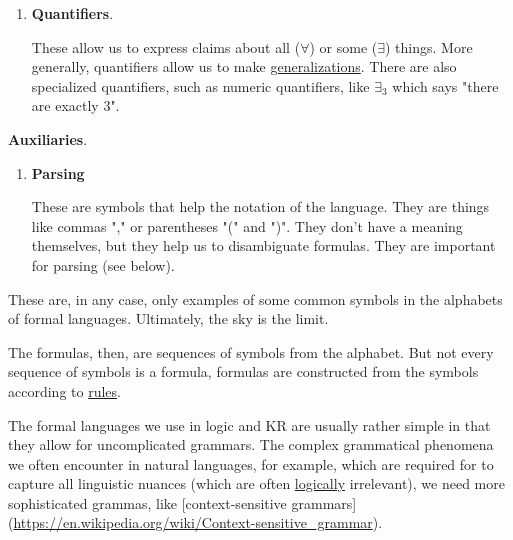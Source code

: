 \documentclass[11pt]{article}
\begin{document}
\begin{enumerate}
```
  IF \ldots{} THEN
      \ldots{}
  ELSE
      \ldots{}
  END IF
```

Similarly, programming languages often have idiosyncratic notation for the
classical propositional connectives (which are, of course, easier to type on
ordinary keyboards), such as \(||\) for disjunction, \(\\&\\&\) for conjunction
in [C](\url{https://en.wikipedia.org/wiki/C\_(programming\_language)}), or simply
\(\mathsf{and}\), \(\mathsf{or}\), \(\mathsf{not}\) in
[Pyton](\url{https://en.wikipedia.org/wiki/Python\_(programming\_language)}).

\item \textbf{\textbf{Quantifiers}}.

These allow us to express claims about all (\(\forall\)) or some (\(\exists\))
things. More generally, quantifiers allow us to make \uline{generalizations}.
There are also specialized quantifiers, such as numeric quantifiers, like
\(\exists_3\) which says "there are exactly 3".
\end{enumerate}

\textbf{\textbf{Auxiliaries}}.

\begin{enumerate}
\item \textbf{\textbf{Parsing}} 

These are symbols that help the notation of the language. They are things
like commas "," or parentheses "(" and ")". They don't have a meaning
themselves, but they help us to disambiguate formulas. They are important
for parsing (see below).
\end{enumerate}

These are, in any case, only examples of some common symbols in the alphabets of
formal languages. Ultimately, the sky is the limit.

The formulas, then, are sequences of symbols from the alphabet. But not every
sequence of symbols is a formula, formulas are constructed from the symbols
according to \uline{rules}.

The formal languages we use in logic and KR are usually rather simple in that
they allow for uncomplicated grammars. The complex grammatical phenomena we
often encounter in natural languages, for example, which are required for to
capture all linguistic nuances (which are often \uline{logically} irrelevant), we need
more sophisticated grammas, like [context-sensitive
grammars](\url{https://en.wikipedia.org/wiki/Context-sensitive\_grammar}).
\end{document}
